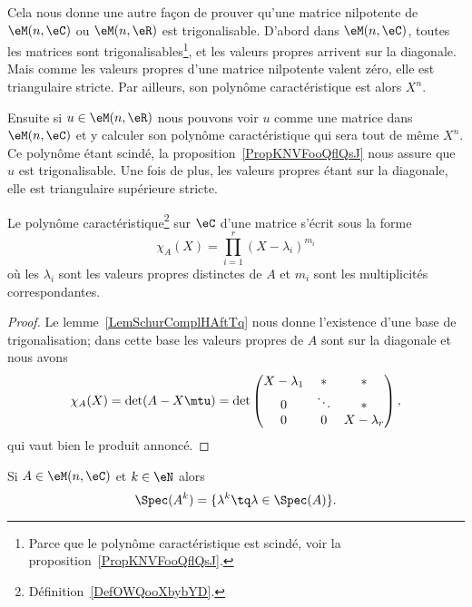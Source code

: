 \begin{remark}  \label{RemREOSooGEDJWX}
	Cela nous donne une autre façon de prouver qu'une matrice nilpotente de \( \eM(n,\eC)\) ou \( \eM(n,\eR)\) est trigonalisable\cite{KDUFooVxwqlC}. D'abord dans \( \eM(n,\eC)\), toutes les matrices sont trigonalisables\footnote{Parce que le polynôme caractéristique est scindé, voir la proposition~\ref{PropKNVFooQflQsJ}.}, et les valeurs propres arrivent sur la diagonale. Mais comme les valeurs propres d'une matrice nilpotente valent zéro, elle est triangulaire stricte. Par ailleurs, son polynôme caractéristique est alors \( X^n\).

	Ensuite si \( u\in \eM(n,\eR)\) nous pouvons voir \( u\) comme une matrice dans \( \eM(n,\eC)\) et y calculer son polynôme caractéristique qui sera tout de même \( X^n\). Ce polynôme étant scindé, la proposition~\ref{PropKNVFooQflQsJ} nous assure que \( u\) est trigonalisable. Une fois de plus, les valeurs propres étant sur la diagonale, elle est triangulaire supérieure stricte.
\end{remark}

\begin{corollary}   \label{CorUNZooAZULXT}
	Le polynôme caractéristique\footnote{Définition~\ref{DefOWQooXbybYD}.} sur \( \eC\) d'une matrice s'écrit sous la forme
	\begin{equation}
		\chi_A(X)=\prod_{i=1}^r(X-\lambda_i)^{m_i}
	\end{equation}
	où les \( \lambda_i\) sont les valeurs propres distinctes de \( A\) et \( m_i\) sont les multiplicités correspondantes.
\end{corollary}

\begin{proof}
	Le lemme~\ref{LemSchurComplHAftTq} nous donne l'existence d'une base de trigonalisation; dans cette base les valeurs propres de \( A\) sont sur la diagonale et nous avons
	\begin{equation}
		\chi_A(X)=\det(A-X\mtu)=\det\begin{pmatrix}
			X-\lambda_1 & *      & *           \\
			0           & \ddots & *           \\
			0           & 0      & X-\lambda_r
		\end{pmatrix},
	\end{equation}
	qui vaut bien le produit annoncé.
\end{proof}

\begin{corollary}       \label{CORooTPDHooXazTuZ}
	Si \( A\in \eM(n,\eC)\) et \( k\in \eN\) alors
	\begin{equation}
		\Spec(A^k)=\{ \lambda^k\tq \lambda\in \Spec(A) \}.
	\end{equation}
\end{corollary}


